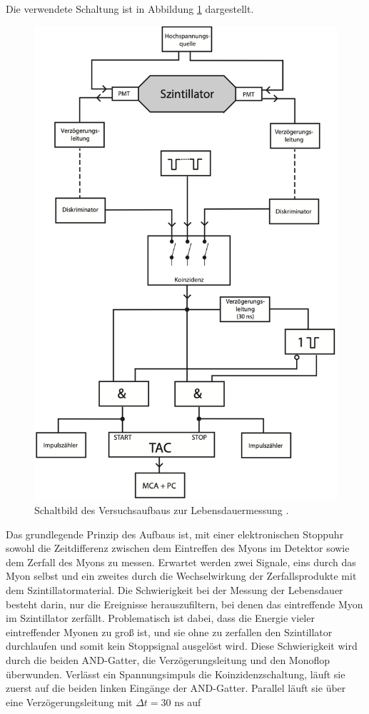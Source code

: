Die verwendete Schaltung ist in Abbildung \ref{fig:schaltung} dargestellt. 
\begin{figure}
    \centering
    \includegraphics[width=0.7\linewidth]{schaltung.png}
    \caption{Schaltbild des Versuchsaufbaus zur Lebensdauermessung \cite{anleitung}.}
    \label{fig:schaltung}
\end{figure}
Das grundlegende Prinzip des Aufbaus ist, mit einer elektronischen Stoppuhr sowohl die Zeitdifferenz zwischen
dem Eintreffen des Myons im Detektor sowie dem Zerfall des Myons zu messen. Erwartet werden zwei Signale, 
eins durch das Myon selbst und ein zweites durch die Wechselwirkung der Zerfallsprodukte mit dem 
Szintillatormaterial. 
Die Schwierigkeit bei der Messung der Lebensdauer besteht darin, nur die Ereignisse herauszufiltern, bei 
denen das eintreffende Myon im Szintillator zerfällt.
Problematisch ist dabei, dass die Energie vieler eintreffender Myonen zu groß ist, und sie ohne zu 
zerfallen den Szintillator durchlaufen und somit kein Stoppsignal ausgelöst wird.
Diese Schwierigkeit wird durch die beiden AND-Gatter, die Verzögerungsleitung und den Monoflop überwunden.
Verlässt ein Spannungsimpuls die Koinzidenzschaltung, läuft sie zuerst auf die beiden linken Eingänge
der AND-Gatter. Parallel läuft sie über eine Verzögerungsleitung mit $\Delta t = 30 \text{ ns}$ auf 
